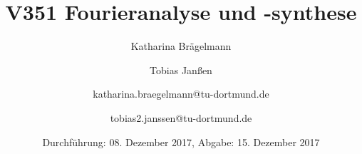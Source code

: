 
\title{V351 Fourieranalyse und -synthese}
\author{Katharina Brägelmann \and Tobias Janßen \and katharina.braegelmann@tu-dortmund.de \and tobias2.janssen@tu-dortmund.de}
\date{Durchführung: 08. Dezember 2017, Abgabe: 15. Dezember 2017}
\maketitle

\tableofcontents
